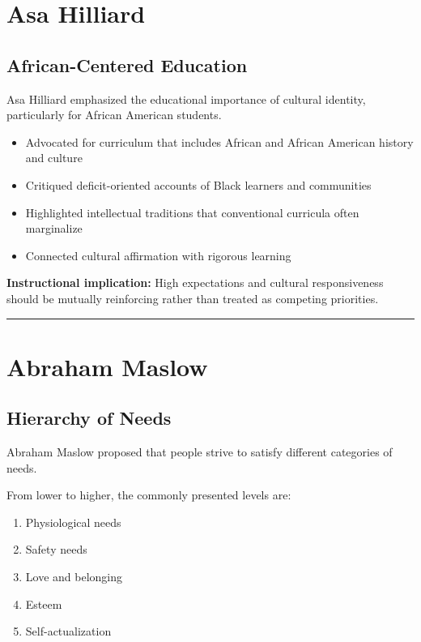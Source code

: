 \documentclass[
  letterpaper,
  DIV=11,
  numbers=noendperiod]{scrartcl}
\providecommand{\tightlist}{%
  \setlength{\itemsep}{0pt}\setlength{\parskip}{0pt}}\usepackage{longtable,booktabs,array}
\begin{document}
\section{Asa Hilliard}\label{asa-hilliard}

\subsection{African-Centered
Education}\label{african-centered-education}

Asa Hilliard emphasized the educational importance of cultural identity,
particularly for African American students.

\begin{itemize}
\tightlist
\item
  Advocated for curriculum that includes African and African American
  history and culture
\item
  Critiqued deficit-oriented accounts of Black learners and communities
\item
  Highlighted intellectual traditions that conventional curricula often
  marginalize
\item
  Connected cultural affirmation with rigorous learning
\end{itemize}

\textbf{Instructional implication:} High expectations and cultural
responsiveness should be mutually reinforcing rather than treated as
competing priorities.

\begin{center}\rule{0.5\linewidth}{0.5pt}\end{center}

\section{Abraham Maslow}\label{abraham-maslow}

\subsection{Hierarchy of Needs}\label{hierarchy-of-needs}

Abraham Maslow proposed that people strive to satisfy different
categories of needs.

From lower to higher, the commonly presented levels are:

\begin{enumerate}
\def\labelenumi{\arabic{enumi}.}
\tightlist
\item
  Physiological needs
\item
  Safety needs
\item
  Love and belonging
\item
  Esteem
\item
  Self-actualization
\end{enumerate}
\end{document}
